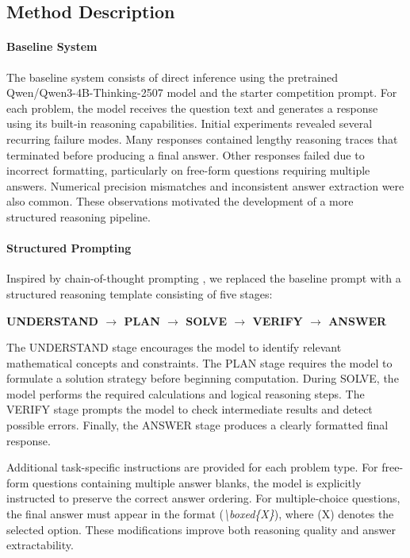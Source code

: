 \documentclass{article}
\begin{document}
\subsection{Method Description}
\label{sec:method_descrip}

\paragraph{Baseline System} The baseline system consists of direct inference using the pretrained Qwen/Qwen3-4B-Thinking-2507 model and the starter competition prompt. For each problem, the model receives the question text and generates a response using its built-in reasoning capabilities. Initial experiments revealed several recurring failure modes. Many responses contained lengthy reasoning traces that terminated before producing a final answer. Other responses failed due to incorrect formatting, particularly on free-form questions requiring multiple answers. Numerical precision mismatches and inconsistent answer extraction were also common. These observations motivated the development of a more structured reasoning pipeline.

\paragraph{Structured Prompting} Inspired by chain-of-thought prompting \cite{wei2022cot}, we replaced the baseline prompt with a structured reasoning template consisting of five stages:

\begin{center}
    \textbf{UNDERSTAND $\rightarrow$ PLAN $\rightarrow$ SOLVE $\rightarrow$ VERIFY $\rightarrow$ ANSWER}
\end{center}

The UNDERSTAND stage encourages the model to identify relevant mathematical concepts and constraints. The PLAN stage requires the model to formulate a solution strategy before beginning computation. During SOLVE, the model performs the required calculations and logical reasoning steps. The VERIFY stage prompts the model to check intermediate results and detect possible errors. Finally, the ANSWER stage produces a clearly formatted final response.

Additional task-specific instructions are provided for each problem type. For free-form questions containing multiple answer blanks, the model is explicitly instructed to preserve the correct answer ordering. For multiple-choice questions, the final answer must appear in the format (\textit{\textbackslash boxed\{X\}}), where (X) denotes the selected option. These modifications improve both reasoning quality and answer extractability.
\end{document}
